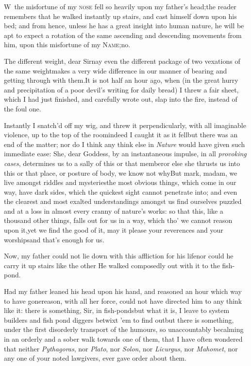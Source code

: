 \documentclass{article}
\begin{document}
\lettrine{W}{\,} the misfortune of my\break
\textsc{nose} fell so heavily upon my\break
father’s head;\tsk the reader remembers that he walked
instantly up stairs, and cast himself down upon his bed; and
from hence, unless he has a great insight into human nature,
he will be apt to expect a rotation of the same ascending
and descending movements from him, upon this misfortune of
my \textsc{Name};\tsh\break no.

The different weight, dear Sir\tsh nay even the
different package of two vexations of the same
weight\tsh makes a very wide difference in our manner of
bearing and getting through with them.\tsk It is not half
an hour ago, when (in the great hurry and precipitation of a poor
devil’s writing for daily bread) I threw a fair sheet, which
I had just finished, and carefully wrote out, slap into the fire,
instead of the foul one.

Instantly I snatch’d off my wig, and threw it
perpendicularly, with all imaginable violence, up to the top of the
room\break\tsk indeed I caught it as it fell\tsk but there was
an end of the matter; nor do I think any think else in
\textit{Nature} would have given such immediate ease: She, dear
Goddess, by an instantaneous impulse, in all \textit{provoking
cases}, determines us to a sally of this or that member\tsk or
else she thrusts us into this or that place, or posture of body, we
know not why\tsk But mark, madam, we live amongst riddles
and mysteries\tsk the most obvious things, which come in
our way, have dark sides, which the quickest sight cannot penetrate
into; and even the clearest and most exalted understandings amongst
us find ourselves puzzled and at a loss in almost every cranny of
nature’s works: so that this, like a thousand other things,
falls out for us in a way, which tho’ we cannot reason upon
it,\tsk yet we find the good of it, may it please your reverences
and your worships\tsh and that’s enough for us.

Now, my father could not lie down with this affliction for his
life\tsk nor could he carry it up stairs like the other\tsk
He walked composedly out with it to the fish-pond.

Had my father leaned his head upon his hand, and reasoned an
hour which way to have gone\tsk reason, with all her
force, could not have directed him to any think like it: there is
something, Sir, in fish-ponds\tsk but what it is, I leave
to system builders and fish pond diggers betwixt ’em to find
out\tsk but there is something, under the first disorderly
transport of the humours, so unaccountably becalming in an orderly
and a sober walk towards one of them, that I have often wondered
that neither \textit{Pythagoras}, nor \textit{Plato}, nor \textit{Solon},
nor \textit{Licurgus}, nor \textit{Mahomet}, nor any one of your noted
lawgivers, ever gave order about them.
\end{document}
